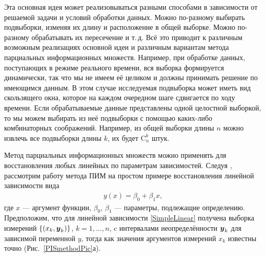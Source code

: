 \documentclass[a5paper,openany]{book}
\newcommand{\mbf}[1]{\protect\text{\boldmath$#1$}}
\newcommand{\mrm}{\mathrm}
\begin{document}
Эта основная идея может реализовываться разными способами в зависимости от решаемой 
задачи и условий обработки данных. Можно по-разному выбирать подвыборки, изменяя их 
длину и расположение в общей выборке. Можно по-разному обрабатывать их пересечение 
и т.\,д. Всё это приводит к различным возможным реализациях основной идеи и различным 
вариантам метода парциальных информационных множеств. Например, при обработке данных, 
поступающих в режиме реального времени, вся выборка формируется динамически, так что 
мы не имеем её целиком и должны принимать решение по имеющимся данным. В этом случае 
исследуемая подвыборка может иметь вид скользящего окна, которое на каждом очередном 
шаге сдвигается по ходу времени. Если обрабатываемые данные представлены одной целостной 
выборкой, то мы можем выбирать из неё подвыборки с помощью каких-либо комбинаторных 
соображений. Например, из общей выборки длины $n$ можно извлечь все подвыборки длины $k$, 
их будет $\mrm{C}_n^k$ штук.     
  
Метод парциальных информационных множеств можно применять для восстановления любых 
линейных по параметрам зависимостей. Следуя \cite{Kumkov2010}, рассмотрим работу 
метода ПИМ на простом примере восстановления линейной зависимости вида  
\begin{equation}
\label{SimpleLinear} 
\begin{array}{l}
y(x) = \beta_{0} + \beta_{1}x,
\end{array}
\end{equation}
где  $x$ --- аргумент функции, $\beta_0$, $\beta_1$ --- параметры, подлежащие определению. 
Предположим, что для линейной зависимости \eqref{SimpleLinear} получена выборка измерений 
$\{(x_k, \mbf{y}_{k})\}$, $k = 1, \ldots, n$, c интервалами неопределённости $\mbf{y}_k$ 
для зависимой переменной $y$, тогда как значения аргументов измерений $x_k$ известны 
точно (Рис.~\ref{PISmethodPic}а). 
  
  
\end{document}
